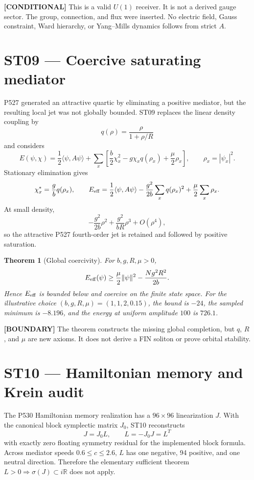 \documentclass[11pt,a4paper]{article}
\newtheorem{theorem}{Theorem}[section]
\newcommand{\conditional}{\textcolor{black!60}{\textbf{[CONDITIONAL]}}}
\newcommand{\boundary}{\textcolor{orange!80!black}{\textbf{[BOUNDARY]}}}
\begin{document}
\conditional{} This is a valid $U(1)$ receiver. It is not a derived gauge sector. The group, connection, and flux were inserted. No electric field, Gauss constraint, Ward hierarchy, or Yang--Mills dynamics follows from strict $A$.

\section{ST09 --- Coercive saturating mediator}

P527 generated an attractive quartic by eliminating a positive mediator, but the resulting local jet was not globally bounded. ST09 replaces the linear density coupling by
\[
q(\rho)=\frac{\rho}{1+\rho/R}
\]
and considers
\[
E(\psi,\chi)=\frac12\langle\psi,A\psi\rangle
+\sum_x\left[\frac b2\chi_x^2-g\chi_xq(\rho_x)+\frac\mu2\rho_x\right],
\qquad \rho_x=|\psi_x|^2.
\]
Stationary elimination gives
\[
\chi_x^*=\frac gbq(\rho_x),\qquad
E_{\rm eff}=\frac12\langle\psi,A\psi\rangle
-\frac{g^2}{2b}\sum_xq(\rho_x)^2+\frac\mu2\sum_x\rho_x.
\]
At small density,
\[
-\frac{g^2}{2b}\rho^2+\frac{g^2}{bR}\rho^3+O(\rho^4),
\]
so the attractive P527 fourth-order jet is retained and followed by positive saturation.

\begin{theorem}[Global coercivity]
For $b,g,R,\mu>0$,
\[
E_{\rm eff}(\psi)\ge \frac\mu2\|\psi\|^2-\frac{Ng^2R^2}{2b}.
\]
Hence $E_{\rm eff}$ is bounded below and coercive on the finite state space. For the illustrative choice $(b,g,R,\mu)=(1,1,2,0.15)$, the bound is $-24$, the sampled minimum is $-8.196$, and the energy at uniform amplitude $100$ is $726.1$.
\end{theorem}

\boundary{} The theorem constructs the missing global completion, but $q$, $R$, and $\mu$ are new axioms. It does not derive a FIN soliton or prove orbital stability.

\section{ST10 --- Hamiltonian memory and Krein audit}

The P530 Hamiltonian memory realization has a $96\times96$ linearization $J$. With the canonical block symplectic matrix $J_0$, ST10 reconstructs
\[
J=J_0L,\qquad L=-J_0J=L^T
\]
with exactly zero floating symmetry residual for the implemented block formula. Across mediator speeds $0.6\le c\le2.6$, $L$ has one negative, 94 positive, and one neutral direction. Therefore the elementary sufficient theorem $L>0\Rightarrow\sigma(J)\subset i\mathbb R$ does not apply.
\end{document}
